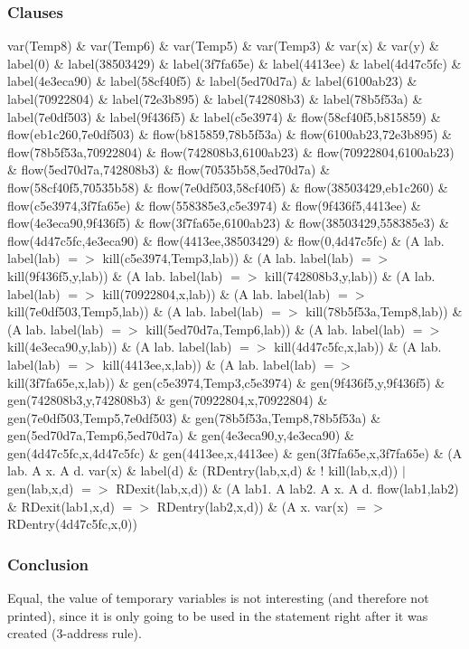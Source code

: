 \documentclass{report}
\begin{document}
\subsubsection{Clauses}
var(Temp8) \& var(Temp6) \& var(Temp5) \& var(Temp3) \& var(x) \& var(y) \& 
label(0) \& label(38503429) \& label(3f7fa65e) \& label(4413ee) \& label(4d47c5fc) \& label(4e3eca90) \& label(58cf40f5) \& label(5ed70d7a) \& label(6100ab23) \& label(70922804) \& label(72e3b895) \& label(742808b3) \& label(78b5f53a) \& label(7e0df503) \& label(9f436f5) \& label(c5e3974) \& 
flow(58cf40f5,b815859) \& flow(eb1c260,7e0df503) \& flow(b815859,78b5f53a) \& flow(6100ab23,72e3b895) \& flow(78b5f53a,70922804) \& flow(742808b3,6100ab23) \& flow(70922804,6100ab23) \& flow(5ed70d7a,742808b3) \& flow(70535b58,5ed70d7a) \& flow(58cf40f5,70535b58) \& flow(7e0df503,58cf40f5) \& flow(38503429,eb1c260) \& flow(c5e3974,3f7fa65e) \& flow(558385e3,c5e3974) \& flow(9f436f5,4413ee) \& flow(4e3eca90,9f436f5) \& flow(3f7fa65e,6100ab23) \& flow(38503429,558385e3) \& flow(4d47c5fc,4e3eca90) \& flow(4413ee,38503429) \& flow(0,4d47c5fc) \& 
(A lab. label(lab) $=>$ kill(c5e3974,Temp3,lab)) \& (A lab. label(lab) $=>$ kill(9f436f5,y,lab)) \& (A lab. label(lab) $=>$ kill(742808b3,y,lab)) \& (A lab. label(lab) $=>$ kill(70922804,x,lab)) \& (A lab. label(lab) $=>$ kill(7e0df503,Temp5,lab)) \& (A lab. label(lab) $=>$ kill(78b5f53a,Temp8,lab)) \& (A lab. label(lab) $=>$ kill(5ed70d7a,Temp6,lab)) \& (A lab. label(lab) $=>$ kill(4e3eca90,y,lab)) \& (A lab. label(lab) $=>$ kill(4d47c5fc,x,lab)) \& (A lab. label(lab) $=>$ kill(4413ee,x,lab)) \& (A lab. label(lab) $=>$ kill(3f7fa65e,x,lab)) \& 
gen(c5e3974,Temp3,c5e3974) \& gen(9f436f5,y,9f436f5) \& gen(742808b3,y,742808b3) \& gen(70922804,x,70922804) \& gen(7e0df503,Temp5,7e0df503) \& gen(78b5f53a,Temp8,78b5f53a) \& gen(5ed70d7a,Temp6,5ed70d7a) \& gen(4e3eca90,y,4e3eca90) \& gen(4d47c5fc,x,4d47c5fc) \& gen(4413ee,x,4413ee) \& gen(3f7fa65e,x,3f7fa65e) \& 
(A lab. A x. A d. var(x) \& label(d) \& (RDentry(lab,x,d) \& ! kill(lab,x,d)) $|$ gen(lab,x,d) $=>$ RDexit(lab,x,d)) \& 
(A lab1. A lab2. A x. A d. flow(lab1,lab2) \& RDexit(lab1,x,d) $=>$ RDentry(lab2,x,d)) \& 
(A x. var(x) $=>$ RDentry(4d47c5fc,x,0))
\subsubsection{Conclusion}
Equal, the value of temporary variables is not interesting (and therefore not printed), since it is only going to be used in the statement right after it was created (3-address rule).
\end{document}
